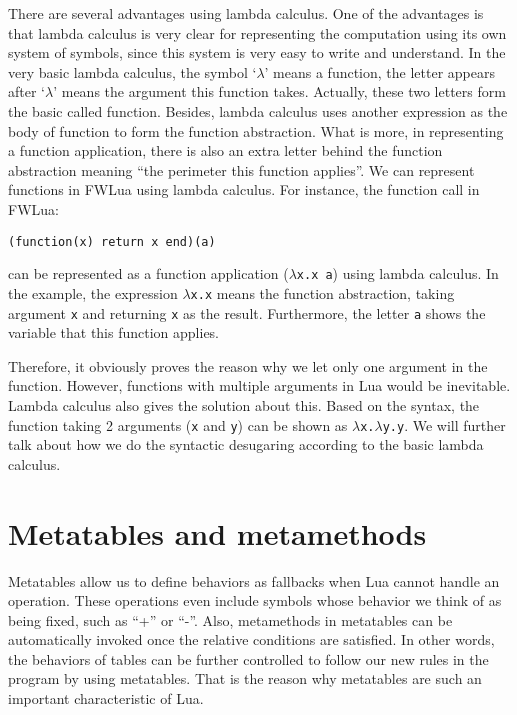 There are several advantages using lambda calculus. One of the advantages is that lambda calculus is very clear for representing the computation using its own system of symbols, since this system is very easy to write and understand. In the very basic lambda calculus, the symbol `$\lambda$' means a function, the letter appears after `$\lambda$' means the argument this function takes.
Actually, these two letters form the basic called function.
Besides, lambda calculus uses another expression as the body of function to form the function abstraction. What is more, in representing a function application, there is also an extra letter behind the function abstraction meaning ``the perimeter this function applies''. We can represent functions in FWLua using lambda calculus. For instance, the function call in FWLua:

\begin{verbatim}
(function(x) return x end)(a)
\end{verbatim}
can be represented as a function application ({\tt $\lambda$x.x a}) using lambda calculus. In the example, the expression {\tt $\lambda$x.x} means the function abstraction, taking argument {\tt x} and returning {\tt x} as the result. Furthermore, the letter {\tt a} shows the variable that this function applies.

Therefore, it obviously proves the reason why we let only one argument in the function. However, functions with multiple arguments in Lua would be inevitable. Lambda calculus also gives the solution about this. Based on the syntax, the function taking 2 arguments ({\tt x} and {\tt y}) can be shown as {\tt $\lambda$x.$\lambda$y.y}. We will further talk about how we do the syntactic desugaring according to the basic lambda calculus.

\newcommand{\abFunction}[2]{{\tt function} ~{#1}~{\tt return}~{#2}~{\tt end}}
\newcommand{\semanticFullRaw}[4]{{#1},{#2} \Downarrow {#3},{#4}}
\newcommand{\semanticFull}[4]{{#1},{#2} \Downarrow {#3}, {#4}}


\section{Metatables and metamethods}
Metatables allow us to define behaviors as fallbacks when Lua cannot handle an operation. These operations even include symbols whose behavior we think of as being fixed, such as ``+'' or ``-''.
Also, metamethods in metatables can be automatically invoked once the relative conditions are satisfied. In other words, the behaviors of tables can be further controlled to follow our new rules in the program by using metatables. That is the reason why metatables are such an important characteristic of Lua.

